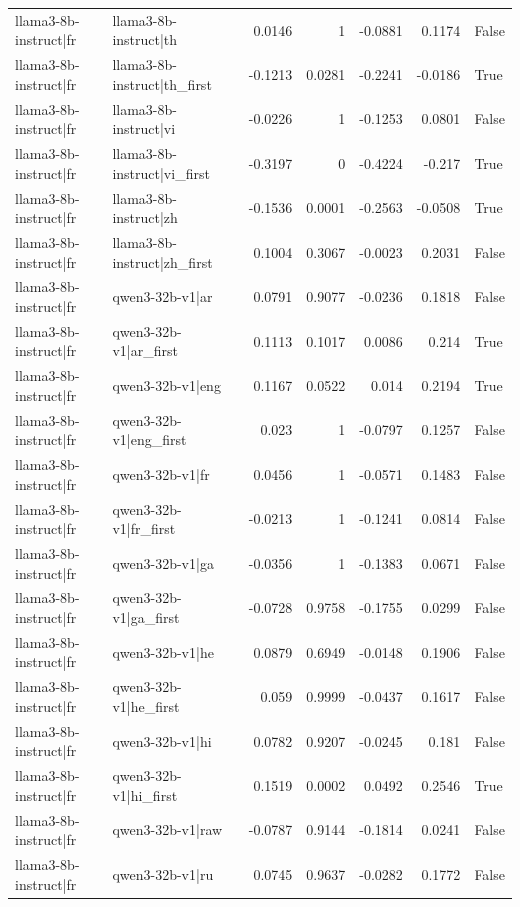 \begin{table}
\begin{tabular}{l l r r r r l}
llama3-8b-instruct|fr & llama3-8b-instruct|th & 0.0146 & 1 & -0.0881 & 0.1174 & False \\
llama3-8b-instruct|fr & llama3-8b-instruct|th_first & -0.1213 & 0.0281 & -0.2241 & -0.0186 & True \\
llama3-8b-instruct|fr & llama3-8b-instruct|vi & -0.0226 & 1 & -0.1253 & 0.0801 & False \\
llama3-8b-instruct|fr & llama3-8b-instruct|vi_first & -0.3197 & 0 & -0.4224 & -0.217 & True \\
llama3-8b-instruct|fr & llama3-8b-instruct|zh & -0.1536 & 0.0001 & -0.2563 & -0.0508 & True \\
llama3-8b-instruct|fr & llama3-8b-instruct|zh_first & 0.1004 & 0.3067 & -0.0023 & 0.2031 & False \\
llama3-8b-instruct|fr & qwen3-32b-v1|ar & 0.0791 & 0.9077 & -0.0236 & 0.1818 & False \\
llama3-8b-instruct|fr & qwen3-32b-v1|ar_first & 0.1113 & 0.1017 & 0.0086 & 0.214 & True \\
llama3-8b-instruct|fr & qwen3-32b-v1|eng & 0.1167 & 0.0522 & 0.014 & 0.2194 & True \\
llama3-8b-instruct|fr & qwen3-32b-v1|eng_first & 0.023 & 1 & -0.0797 & 0.1257 & False \\
llama3-8b-instruct|fr & qwen3-32b-v1|fr & 0.0456 & 1 & -0.0571 & 0.1483 & False \\
llama3-8b-instruct|fr & qwen3-32b-v1|fr_first & -0.0213 & 1 & -0.1241 & 0.0814 & False \\
llama3-8b-instruct|fr & qwen3-32b-v1|ga & -0.0356 & 1 & -0.1383 & 0.0671 & False \\
llama3-8b-instruct|fr & qwen3-32b-v1|ga_first & -0.0728 & 0.9758 & -0.1755 & 0.0299 & False \\
llama3-8b-instruct|fr & qwen3-32b-v1|he & 0.0879 & 0.6949 & -0.0148 & 0.1906 & False \\
llama3-8b-instruct|fr & qwen3-32b-v1|he_first & 0.059 & 0.9999 & -0.0437 & 0.1617 & False \\
llama3-8b-instruct|fr & qwen3-32b-v1|hi & 0.0782 & 0.9207 & -0.0245 & 0.181 & False \\
llama3-8b-instruct|fr & qwen3-32b-v1|hi_first & 0.1519 & 0.0002 & 0.0492 & 0.2546 & True \\
llama3-8b-instruct|fr & qwen3-32b-v1|raw & -0.0787 & 0.9144 & -0.1814 & 0.0241 & False \\
llama3-8b-instruct|fr & qwen3-32b-v1|ru & 0.0745 & 0.9637 & -0.0282 & 0.1772 & False \\

\end{tabular}
\end{table}
